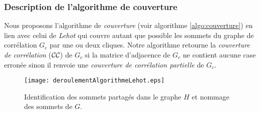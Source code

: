 \subsubsection{Description de l'algorithme de couverture}
Nous proposons  l'algorithme de {\em couverture} (voir algorithme \ref{algo:couverture}) en lien avec celui de {\em Lehot} qui couvre  autant que possible les sommets du graphe de corr\'elation  $G_c$ par une ou deux cliques.
Notre algorithme retourne la {\em couverture de corr\'elation} (${\cal CC}$) de $G_c$ si la matrice d'adjacence de $G_c$ ne contient aucune case erron\'ee sinon il renvoie une {\em couverture de corr\'elation partielle} de $G_c$.
\newline
\begin{figure}[htb!]
	\centering
	\texttt{[image: deroulementAlgorithmeLehot.eps]}\vspace{-0.5em}
	\caption{ Identification des sommets partag\'es dans le graphe $H$ et nommage des sommets de $G$. }\vspace{-0.5em}
	\label{deroulementAlgorithmeLehotRechercheSommetsPartages}
\end{figure}
\FloatBarrier

